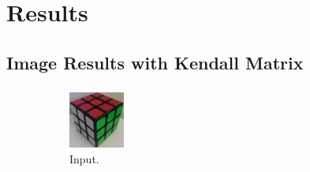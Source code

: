 \documentclass{beamer}
\theoremstyle{definition}
\theoremstyle{remark}
\theoremstyle{example}
\newif\ifinsection
\newif\ifinsubsection
\let\oldsection\section
\renewcommand{\section}{
  \global\insectiontrue
  \global\insubsectionfalse
  \oldsection}
\let\oldsubsection\subsection
\renewcommand{\subsection}{
  \global\insubsectiontrue
  \oldsubsection}
\newcommand {\aframe}[1] {
  \begin{frame}
    \ifinsection\frametitle{\secname}\fi
    \ifinsubsection\framesubtitle{\subsecname}\fi
  #1
  \end{frame}
}
\begin{document}
\section{Results}
\subsection{Image Results with Kendall Matrix}
\aframe{
  \begin{figure}
    \centering
    \begin{subfigure}[b]{0.32\textwidth}
      \centering \includegraphics[width=\textwidth]{figs/input2.jpg}
      \caption{Input.}
    \end{subfigure}
    \begin{subfigure}[b]{0.32\textwidth}

\end{subfigure}
\end{figure}}
\end{document}
